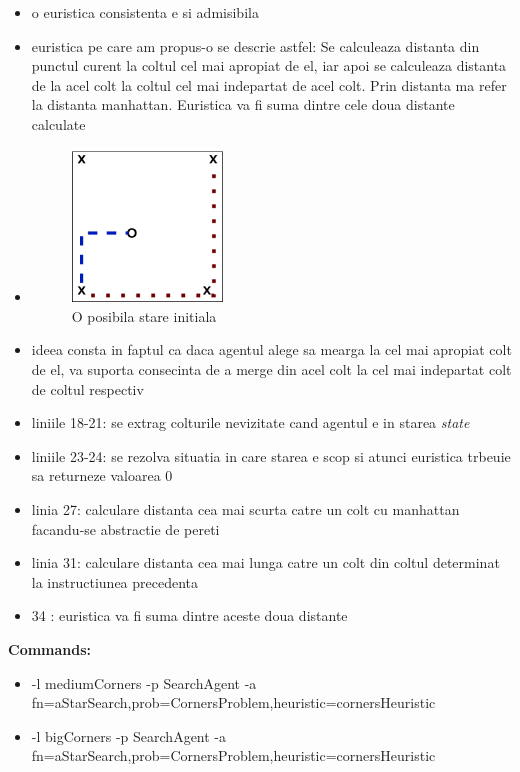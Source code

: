 \begin{itemize}
    \item o euristica consistenta e si admisibila
    \item euristica pe care am propus-o se descrie astfel: Se calculeaza distanta din punctul curent la coltul cel mai apropiat de el, iar apoi se calculeaza distanta de la acel colt la coltul cel mai indepartat de acel colt. Prin distanta ma refer la distanta manhattan. Euristica va fi suma dintre cele doua distante calculate
    \item \begin{figure}[htp]
         \centering
         \includegraphics[width=4cm]{text/images/corner.png}
         \caption{O posibila stare initiala}
         \label{fig:corner}
         \end{figure}
    \item ideea consta in faptul ca daca agentul alege sa mearga la cel mai apropiat colt de el, va suporta consecinta de a merge din acel colt la cel mai indepartat colt de coltul respectiv 
    \item liniile 18-21: se extrag colturile nevizitate cand agentul e in starea \textit{state}
    \item liniile 23-24: se rezolva situatia in care starea e scop si atunci euristica trbeuie sa returneze valoarea 0
    \item linia 27: calculare distanta cea mai scurta catre un colt cu manhattan facandu-se abstractie de pereti
    \item linia 31: calculare distanta cea mai lunga catre un colt din coltul determinat la instructiunea precedenta 
    \item 34 : euristica va fi suma dintre aceste doua distante \newline
\end{itemize}


\textbf{Commands:}
\begin{itemize}
    \setlength\itemsep{0em}
    \item -l mediumCorners -p SearchAgent -a fn=aStarSearch,prob=CornersProblem,heuristic=cornersHeuristic
    \item  -l bigCorners -p SearchAgent -a fn=aStarSearch,prob=CornersProblem,heuristic=cornersHeuristic
\end{itemize}

